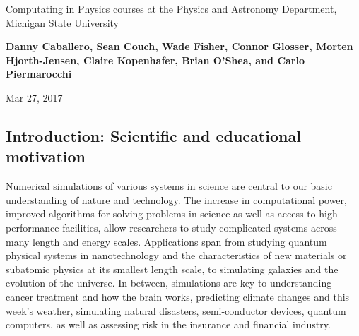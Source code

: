 \documentclass[%
oneside,                 %
final,                   %
10pt]{article}
\begin{document}

\newcommand{\exercisesection}[1]{\subsection*{#1}}






\thispagestyle{empty}

\begin{center}
{\LARGE\bf
\begin{spacing}{1.25}
Computating in Physics courses  at the Physics and Astronomy Department, Michigan State University
\end{spacing}
}
\end{center}


\begin{center}
{\bf Danny Caballero, Sean Couch, Wade Fisher, Connor Glosser, Morten Hjorth-Jensen, Claire Kopenhafer, Brian O'Shea, and Carlo Piermarocchi${}^{}$} \\ [0mm]
\end{center}

\begin{center}
\end{center}
    

\begin{center}
Mar 27, 2017
\end{center}

\vspace{1cm}


\subsection{Introduction: Scientific and educational motivation}

Numerical simulations of various systems in science are central to our
basic understanding of nature and technology.
The increase in computational power,
improved algorithms for solving problems in science as well as access
to high-performance facilities, allow researchers to study
complicated systems across many length and energy scales. Applications
span from studying quantum physical systems in nanotechnology and the
characteristics of new materials or subatomic physics at its smallest
length scale, to simulating galaxies and the evolution of the universe.
In between, simulations are key to understanding
cancer treatment and how the brain works,
predicting climate changes and this week's weather,
simulating natural disasters, semi-conductor devices,
quantum computers, as well as assessing risk in the insurance and
financial industry.
\end{document}
